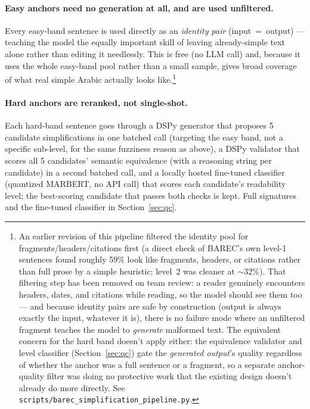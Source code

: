 \documentclass[11pt,a4paper]{article}
\begin{document}
\paragraph{Easy anchors need no generation at all, and are used unfiltered.}
Every easy-band sentence is used directly as an \emph{identity pair}
(input~=~output) --- teaching the model the equally important skill of
leaving already-simple text alone rather than editing it needlessly. This is
free (no LLM call) and, because it uses the whole easy-band pool rather than
a small sample, gives broad coverage of what real simple Arabic actually
looks like.\footnote{An earlier revision of this pipeline filtered the
identity pool for fragments/headers/citations first (a direct check of
BAREC's own level-1 sentences found roughly 59\% look like fragments,
headers, or citations rather than full prose by a simple heuristic; level~2
was cleaner at $\sim$32\%).
That filtering step has been removed on team review: a reader genuinely
encounters headers, dates, and citations while reading, so the model should
see them too --- and because identity pairs are safe by construction
(output is always exactly the input, whatever it is), there is no failure
mode where an unfiltered fragment teaches the model to \emph{generate}
malformed text. The equivalent concern for the hard band doesn't apply
either: the equivalence validator and level classifier
(Section~\ref{sec:qc}) gate the
\emph{generated output}'s quality regardless of whether the anchor was a
full sentence or a fragment, so a separate anchor-quality filter was doing
no protective work that the existing design doesn't already do more
directly. See \texttt{scripts/barec\_simplification\_pipeline.py}.}

\paragraph{Hard anchors are reranked, not single-shot.} Each hard-band
sentence goes through a DSPy generator that proposes 5 candidate
simplifications in one batched call (targeting the easy band, not a
specific sub-level, for the same fuzziness reason as above), a DSPy
validator that scores all 5 candidates' semantic equivalence (with a
reasoning string per candidate) in a second batched call, and a locally
hosted fine-tuned classifier (quantized MARBERT, no API call) that scores
each candidate's readability level; the best-scoring candidate that passes
both checks is kept. Full signatures and the fine-tuned classifier in
Section~\ref{sec:qc}.
\end{document}
